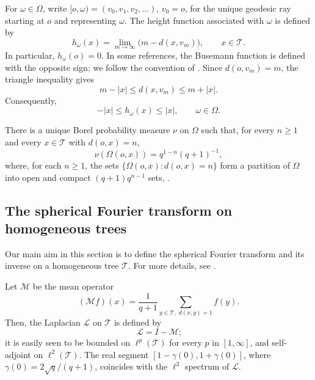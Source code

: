\documentclass[10pt,a4paper]{amsart}
\renewcommand\mathcal{\mathscr}
\theoremstyle{plain}
\theoremstyle{remark}
\theoremstyle{definition}
\begin{document}
For $\omega\in\Omega$, write $[o,\omega)=(v_0,v_1,v_2,\ldots)$, $v_0=o$,
for the unique geodesic ray starting at $o$ and representing $\omega$.
The height function associated with $\omega$ is defined by
\[
h_\omega(x)
=
\lim_{m\to\infty}\bigl(m-d(x,v_m)\bigr),
\qquad x\in\mathcal T.
\]
In particular, $h_\omega(o)=0$. In some references, the Busemann
function is defined with the opposite sign; we follow the convention
of \cite{CMS0}. Since $d(o,v_m)=m$, the triangle inequality gives
\[
m-|x|\leq d(x,v_m)\leq m+|x|.
\]
Consequently,
\begin{equation}\label{eq:Busemann_bds}
-|x|\leq h_\omega(x)\leq |x|,
\qquad \omega\in\Omega.
\end{equation}


There is a unique Borel probability measure $\nu$ on $\Omega$ such that, for every $n\geq1$ and every
$x\in\mathcal T$ with $d(o,x)=n$,
\[
\nu(\Omega(o,x))
=
{q^{1-n}}{(q+1)^{-1}},
\]
where, for each $n\geq1$, the sets $\{\Omega(o,x):d(o,x)=n\}$
form a partition of $\Omega$ into open and compact $(q+1)q^{n-1}$ sets, \cite[p.5]{Figa}.


	
	\subsection{The spherical Fourier transform on homogeneous trees}\label{sec:FT}
	Our main aim in this section is to define the spherical Fourier transform and its inverse on a homogeneous tree $\mathcal{T}$. For more details, see \cite{CMS0, CMS, Figa, VECA}.
	
	Let $\mathcal{M}$ be the mean operator
	\begin{equation*}
		(\mathcal{M}f)(x)=\frac{1}{q+1}\sum\limits_{y\in \mathcal{T},\; d(x,y)=1}f(y).
	\end{equation*} Then, the Laplacian $\mathcal{L}$ on $\mathcal{T}$ is defined by
	\[\
	\mathcal{L}=I-\mathcal{M};
	\]
	it is easily seen to be bounded on $\ell^p(\mathcal{T})$ for every $p$ in $[1, \infty]$, and self-adjoint on $\ell^2(\mathcal{T})$. The real segment $[1-\gamma(0),1+\gamma(0)]$, where $\gamma(0)=2\sqrt{q}/(q+1)$, coincides with the $\ell^2$ spectrum of $\mathcal{L}$.
\end{document}
